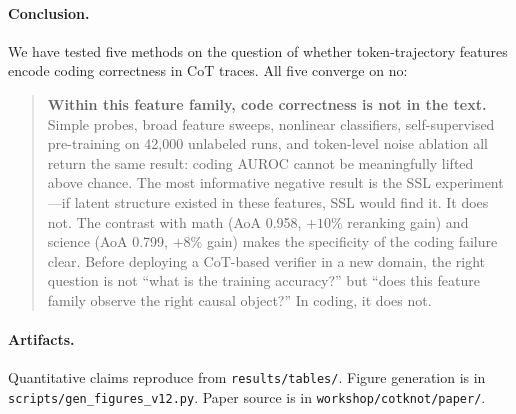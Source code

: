 \documentclass[10pt,twocolumn]{article}
\begin{document}
\paragraph{Conclusion.} We have tested five methods on the question of whether token-trajectory features encode coding correctness in CoT traces. All five converge on no:

\begin{quote}
\textbf{Within this feature family, code correctness is not in the text.}
Simple probes, broad feature sweeps, nonlinear classifiers, self-supervised pre-training on 42,000 unlabeled runs, and token-level noise ablation all return the same result: coding AUROC cannot be meaningfully lifted above chance. The most informative negative result is the SSL experiment---if latent structure existed in these features, SSL would find it. It does not.
The contrast with math (AoA 0.958, $+10\%$ reranking gain) and science (AoA 0.799, $+8\%$ gain) makes the specificity of the coding failure clear. Before deploying a CoT-based verifier in a new domain, the right question is not ``what is the training accuracy?'' but ``does this feature family observe the right causal object?'' In coding, it does not.
\end{quote}

\paragraph{Artifacts.} Quantitative claims reproduce from \texttt{results/tables/}. Figure generation is in \texttt{scripts/gen\_figures\_v12.py}. Paper source is in \texttt{workshop/cotknot/paper/}.
\end{document}
